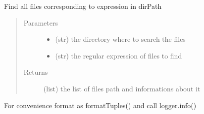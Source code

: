 \documentclass[a4paper,10pt,english]{sphinxmanual}
\begin{document}
\begin{fulllineitems}
\label{\detokenize{apidoc_src/src:src.utilsSat.list_log_file}}
Find all files corresponding to expression in dirPath
\begin{quote}\begin{description}
\item[{Parameters}] \leavevmode\begin{itemize}
\item {} 
 \textendash{} (str) the directory where to search the files

\item {} 
 \textendash{} (str) the regular expression of files to find

\end{itemize}

\item[{Returns}] \leavevmode
(list) the list of files path and informations about it

\end{description}\end{quote}

\end{fulllineitems}


\begin{fulllineitems}
\label{\detokenize{apidoc_src/src:src.utilsSat.log_res_step}}
\end{fulllineitems}


\begin{fulllineitems}
\label{\detokenize{apidoc_src/src:src.utilsSat.log_step}}
\end{fulllineitems}


\begin{fulllineitems}
\label{\detokenize{apidoc_src/src:src.utilsSat.logger_info_tuples}}
For convenience
format as formatTuples() and call logger.info()

\end{fulllineitems}
\end{document}
